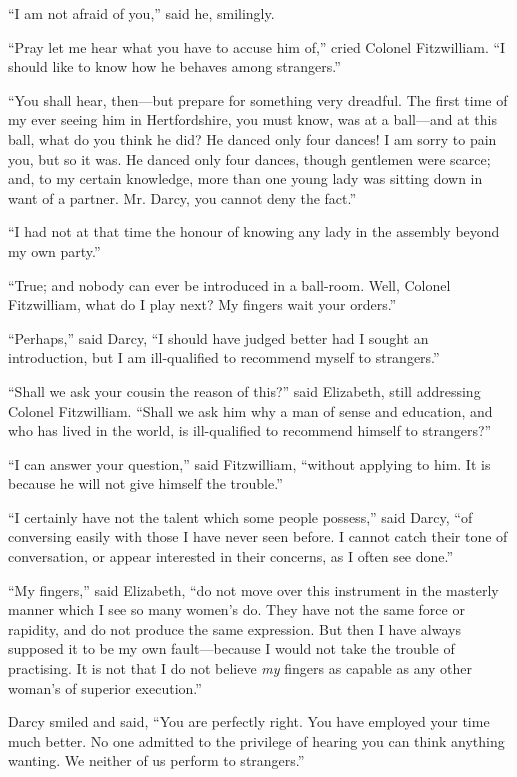 \documentclass[12pt,openright]{book}
\begin{document}
“I am not afraid of you,” said he, smilingly.

“Pray let me hear what you have to accuse him of,” cried Colonel Fitzwilliam. “I should like to know how he behaves among strangers.”

“You shall hear, then—but prepare for something very dreadful. The first time of my ever seeing him in Hertfordshire, you must know, was at a ball—and at this ball, what do you think he did? He danced only four dances! I am sorry to pain you, but so it was. He danced only four dances, though gentlemen were scarce; and, to my certain knowledge, more than one young lady was sitting down in want of a partner. Mr. Darcy, you cannot deny the fact.”

“I had not at that time the honour of knowing any lady in the assembly beyond my own party.”

“True; and nobody can ever be introduced in a ball-room. Well, Colonel Fitzwilliam, what do I play next? My fingers wait your orders.”

“Perhaps,” said Darcy, “I should have judged better had I sought an introduction, but I am ill-qualified to recommend myself to strangers.”

“Shall we ask your cousin the reason of this?” said Elizabeth, still addressing Colonel Fitzwilliam. “Shall we ask him why a man of sense and education, and who has lived in the world, is ill-qualified to recommend himself to strangers?”

“I can answer your question,” said Fitzwilliam, “without applying to him. It is because he will not give himself the trouble.”

“I certainly have not the talent which some people possess,” said Darcy, “of conversing easily with those I have never seen before. I cannot catch their tone of conversation, or appear interested in their concerns, as I often see done.”

“My fingers,” said Elizabeth, “do not move over this instrument in the masterly manner which I see so many women’s do. They have not the same force or rapidity, and do not produce the same expression. But then I have always supposed it to be my own fault—because I would not take the trouble of practising. It is not that I do not believe \textit{my} fingers as capable as any other woman’s of superior execution.”

Darcy smiled and said, “You are perfectly right. You have employed your time much better. No one admitted to the privilege of hearing you can think anything wanting. We neither of us perform to strangers.”
\end{document}
